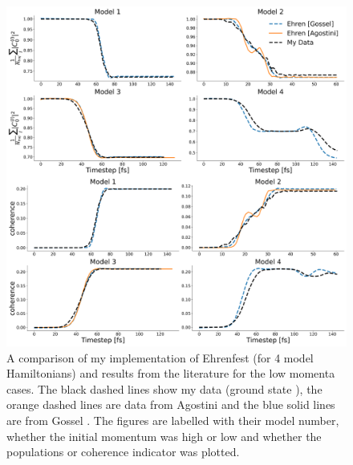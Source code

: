 \begin{figure}[ht]
	\includegraphics[width=\textwidth]{../img/CTMQC/TullyModels/Ehren_lowMom.png}
	\caption{\label{fig:LitCompEhrenTullyLow}A comparison of my implementation of Ehrenfest (for 4 model Hamiltonians) and results from the literature for the low momenta cases. The black dashed lines show my data (ground state ), the orange dashed lines are data from Agostini \cite{agostini_quantum-classical_2016} and the blue solid lines are from Gossel \cite{gossel_coupled-trajectory_2018}. The figures are labelled with their model number, whether the initial momentum was high or low and whether the populations or coherence indicator was plotted.}
\end{figure}
